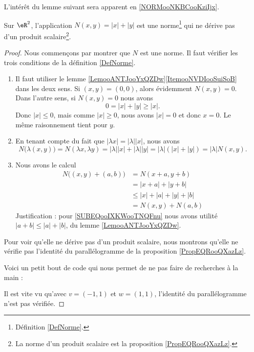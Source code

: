 L'intérêt du lemme suivant sera apparent en \ref{NORMooNKBCooKziIjx}.
\begin{lemma}   \label{LEMooRWJYooOIJkZc}
    Sur \( \eR^2\), l'application \( N(x,y)=| x |+| y |\) est une norme\footnote{Définition \ref{DefNorme}.} qui ne dérive pas d'un produit scalaire\footnote{La norme d'un produit scalaire est la proposition  \ref{PropEQRooQXazLz}.}.
\end{lemma}

\begin{proof}
    Nous commençons par montrer que \( N\) est une norme. Il faut vérifier les trois conditions de la définition \ref{DefNorme}.
    \begin{enumerate}
        \item
            Il faut utiliser le lemme \ref{LemooANTJooYxQZDw}\ref{ItemooNVDIooSuiSoB} dans les deux sens. Si \( (x,y)=(0,0)\), alors évidemment \( N(x,y)=0\). Dans l'autre sens, si \( N(x,y)=0\) nous avons
            \begin{equation}
                0=| x |+| y |\geq | x |.
            \end{equation}
            Donc \( | x |\leq 0\), mais comme \( | x |\geq 0\), nous avons \( | x |=0\) et donc \( x=0\). Le même raisonnement tient pour \( y\).
        \item
            En tenant compte du fait que \( | \lambda x |=| \lambda | |x |\), nous avons
            \begin{equation}
                N\big( \lambda(x,y) \big)=N(\lambda x,\lambda y)=| \lambda | |x |+| \lambda | |y |=| \lambda |(| x |+| y |)=| \lambda |N(x,y).
            \end{equation}
        \item
            Nous avons le calcul
            \begin{subequations}
                \begin{align}
                    N\big( (x,y)+(a,b) \big)&=N(x+a,y+b)\\
                    &=| x+a |+| y+b |\\
                    &\leq | x |+| a |+| y |+| b |       \label{SUBEQooIXKWooTNQFnu}\\
                    &=N(x,y)+N(a,b)
                \end{align}
            \end{subequations}
            Justification : pour \eqref{SUBEQooIXKWooTNQFnu} nous avons utilité \( | a+b |\leq | a |+| b |\), du lemme \ref{LemooANTJooYxQZDw}.
    \end{enumerate}
    Pour voir qu'elle ne dérive pas d'un produit scalaire, nous montrons qu'elle ne vérifie pas l'identité du parallélogramme de la proposition \ref{PropEQRooQXazLz}.

    Voici un petit bout de code qui nous permet de ne pas faire de recherches à la main :
    

    Il est vite vu qu'avec \( v=(-1,1)\) et \( w=(1,1)\), l'identité du parallélogramme n'est pas vérifiée.
\end{proof}


